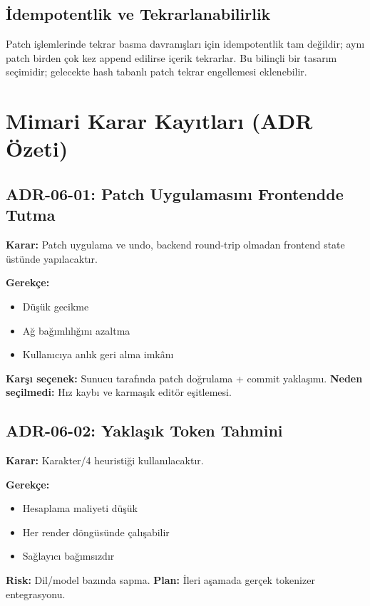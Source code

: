 \documentclass[12pt,a4paper]{article}
\begin{document}
\subsection{İdempotentlik ve Tekrarlanabilirlik}
Patch işlemlerinde tekrar basma davranışları için idempotentlik tam değildir; aynı patch birden çok kez append edilirse içerik tekrarlar. Bu bilinçli bir tasarım seçimidir; gelecekte hash tabanlı patch tekrar engellemesi eklenebilir.

\section{Mimari Karar Kayıtları (ADR Özeti)}

\subsection{ADR-06-01: Patch Uygulamasını Frontendde Tutma}
\textbf{Karar:} Patch uygulama ve undo, backend round-trip olmadan frontend state üstünde yapılacaktır.

\textbf{Gerekçe:}
\begin{itemize}[leftmargin=*]
  \item Düşük gecikme
  \item Ağ bağımlılığını azaltma
  \item Kullanıcıya anlık geri alma imkânı
\end{itemize}

\textbf{Karşı seçenek:} Sunucu tarafında patch doğrulama + commit yaklaşımı.\newline
\textbf{Neden seçilmedi:} Hız kaybı ve karmaşık editör eşitlemesi.

\subsection{ADR-06-02: Yaklaşık Token Tahmini}
\textbf{Karar:} Karakter/4 heuristiği kullanılacaktır.

\textbf{Gerekçe:}
\begin{itemize}[leftmargin=*]
  \item Hesaplama maliyeti düşük
  \item Her render döngüsünde çalışabilir
  \item Sağlayıcı bağımsızdır
\end{itemize}

\textbf{Risk:} Dil/model bazında sapma.\newline
\textbf{Plan:} İleri aşamada gerçek tokenizer entegrasyonu.
\end{document}
